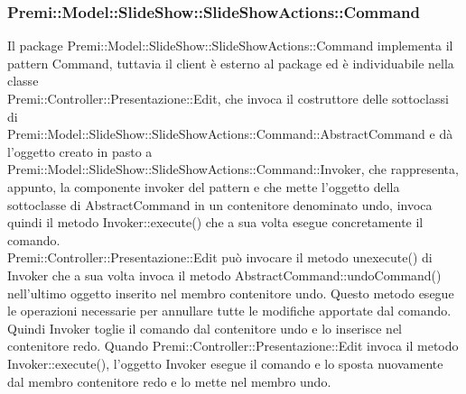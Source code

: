 {{		\subsubsection{Premi::Model::SlideShow::SlideShowActions::Command}{
			Il package Premi::Model::SlideShow::SlideShowActions::Command implementa il pattern Command, tuttavia il client è esterno al package ed è individuabile nella classe\\ Premi::Controller::Presentazione::Edit, che invoca il costruttore delle sottoclassi di\\ Premi::Model::SlideShow::SlideShowActions::Command::AbstractCommand e dà l'oggetto creato in pasto a Premi::Model::SlideShow::SlideShowActions::Command::Invoker, che rappresenta, appunto, la componente invoker del pattern e che mette l'oggetto della sottoclasse di AbstractCommand in un contenitore denominato undo, invoca quindi il metodo Invoker::execute() che a sua volta esegue concretamente il comando.\\
			Premi::Controller::Presentazione::Edit può invocare il metodo unexecute() di Invoker che a sua volta invoca il metodo AbstractCommand::undoCommand() nell'ultimo oggetto inserito nel membro contenitore undo. Questo metodo esegue le operazioni necessarie per annullare tutte le modifiche apportate dal comando. Quindi Invoker toglie il comando dal contenitore undo e lo inserisce nel contenitore redo. Quando Premi::Controller::Presentazione::Edit invoca il metodo Invoker::execute(), l'oggetto Invoker esegue il comando e lo sposta nuovamente dal membro contenitore redo e lo mette nel membro undo.    
		}
	}
	}
